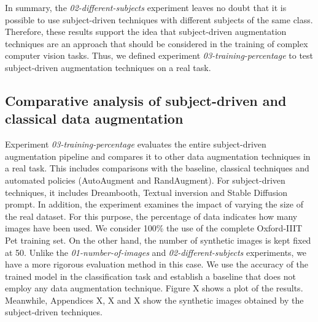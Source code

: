 In summary, the \textit{02-different-subjects} experiment leaves no doubt that it is possible to use subject-driven techniques with different subjects of the same class. Therefore, these results support the idea that subject-driven augmentation techniques are an approach that should be considered in the training of complex computer vision tasks. Thus, we defined experiment \textit{03-training-percentage} to test subject-driven augmentation techniques on a real task.

\subsection{Comparative analysis of subject-driven and classical data augmentation} \label{sec: exp-03}

Experiment \textit{03-training-percentage} evaluates the entire subject-driven augmentation pipeline and compares it to other data augmentation techniques in a real task. This includes comparisons with the baseline, classical techniques and automated policies (AutoAugment and RandAugment). For subject-driven techniques, it includes Dreambooth, Textual inversion and Stable Diffusion prompt. In addition, the experiment examines the impact of varying the size of the real dataset. For this purpose, the percentage of data indicates how many images have been used. We consider 100\% the use of the complete Oxford-IIIT Pet training set. On the other hand, the number of synthetic images is kept fixed at 50. Unlike the \textit{01-number-of-images} and \textit{02-different-subjects} experiments, we have a more rigorous evaluation method in this case. We use the accuracy of the trained model in the classification task and establish a baseline that does not employ any data augmentation technique. Figure X shows a plot of the results. Meanwhile, Appendices X, X and X show the synthetic images obtained by the subject-driven techniques.

